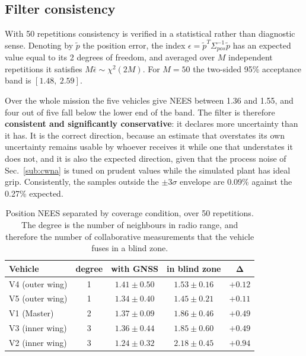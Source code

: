 \documentclass[conference,9pt]{IEEEtran}
\begin{document}
\subsection{Filter consistency}

With 50 repetitions consistency is verified in a statistical rather than
diagnostic sense. Denoting by $\tilde p$ the position error, the index
$\epsilon = \tilde p^T \Sigma_{pos}^{-1} \tilde p$ has an expected value equal
to its 2 degrees of freedom, and averaged over $M$ independent repetitions it
satisfies $M\bar\epsilon \sim \chi^2(2M)$. For $M = 50$ the two-sided 95\%
acceptance band is $[1.48,\ 2.59]$.

Over the whole mission the five vehicles give NEES between 1.36 and 1.55, and
four out of five fall below the lower end of the band. The filter is therefore
\textbf{consistent and significantly conservative}: it declares more
uncertainty than it has. It is the correct direction, because an estimate that
overstates its own uncertainty remains usable by whoever receives it while one
that understates it does not, and it is also the expected direction, given that
the process noise of Sec.~\ref{sub:cwna} is tuned on prudent values while the
simulated plant has ideal grip. Consistently, the samples outside the
$\pm 3\sigma$ envelope are 0.09\% against the 0.27\% expected.

\begin{table}[t]
\centering
\caption{Position NEES separated by coverage condition, over 50 repetitions.
The degree is the number of neighbours in radio range, and therefore the number
of collaborative measurements that the vehicle fuses in a blind zone.}
\label{tab:nees}
\begin{tabular}{lcccc}
\toprule
\textbf{Vehicle} & \textbf{degree} & \textbf{with GNSS} & \textbf{in blind zone} &
$\mathbf{\Delta}$\\
\midrule
V4 (outer wing) & 1 & $1.41 \pm 0.50$ & $1.53 \pm 0.16$ & $+0.12$\\
V5 (outer wing) & 1 & $1.34 \pm 0.40$ & $1.45 \pm 0.21$ & $+0.11$\\
V1 (Master)     & 2 & $1.37 \pm 0.09$ & $1.86 \pm 0.46$ & $+0.49$\\
V3 (inner wing) & 3 & $1.36 \pm 0.44$ & $1.85 \pm 0.60$ & $+0.49$\\
V2 (inner wing) & 3 & $1.24 \pm 0.32$ & $\mathbf{2.18 \pm 0.45}$ & $\mathbf{+0.94}$\\
\bottomrule
\end{tabular}
\end{table}
\end{document}
